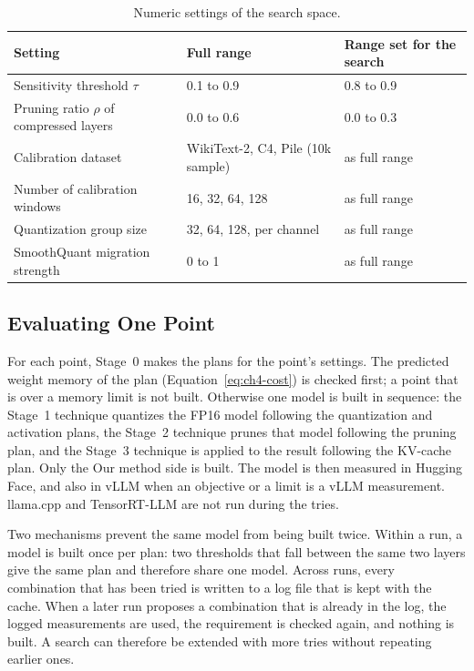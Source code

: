 \begin{table}[htbp]
\centering
\small
\caption{Numeric settings of the search space.}
\label{tab:ch4-space}
\renewcommand{\arraystretch}{1.2}
\begin{tabularx}{\textwidth}{Xll}
\hline
\textbf{Setting} & \textbf{Full range} & \textbf{Range set for the search} \\
\hline
Sensitivity threshold $\tau$ & 0.1 to 0.9 & 0.8 to 0.9 \\
Pruning ratio $\rho$ of compressed layers & 0.0 to 0.6 & 0.0 to 0.3 \\
Calibration dataset & WikiText-2, C4, Pile (10k sample) & as full range \\
Number of calibration windows & 16, 32, 64, 128 & as full range \\
Quantization group size & 32, 64, 128, per channel & as full range \\
SmoothQuant migration strength & 0 to 1 & as full range \\
\hline
\end{tabularx}
\end{table}

\subsection{Evaluating One Point}
\label{sec:ch4-point}

For each point, Stage~0 makes the plans for the point's settings. The predicted weight memory of the plan (Equation~\ref{eq:ch4-cost}) is checked first; a point that is over a memory limit is not built. Otherwise one model is built in sequence: the Stage~1 technique quantizes the FP16 model following the quantization and activation plans, the Stage~2 technique prunes that model following the pruning plan, and the Stage~3 technique is applied to the result following the KV-cache plan. Only the Our method side is built. The model is then measured in Hugging Face, and also in vLLM when an objective or a limit is a vLLM measurement. llama.cpp and TensorRT-LLM are not run during the tries.

Two mechanisms prevent the same model from being built twice. Within a run, a model is built once per plan: two thresholds that fall between the same two layers give the same plan and therefore share one model. Across runs, every combination that has been tried is written to a log file that is kept with the cache. When a later run proposes a combination that is already in the log, the logged measurements are used, the requirement is checked again, and nothing is built. A search can therefore be extended with more tries without repeating earlier ones.

